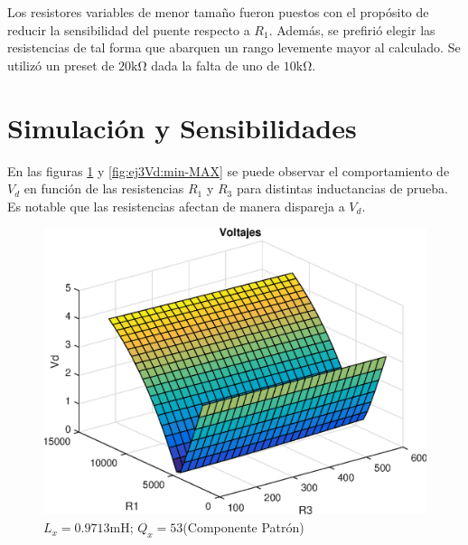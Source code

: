     \begin{figure}[ht!]
        \begin{center}
            
        \end{center}
    \end{figure}

    Los resistores variables de menor tamaño fueron puestos con el propósito de reducir
    la sensibilidad del puente respecto a $R_1$. Además, se prefirió elegir las resistencias de tal forma que
    abarquen un rango levemente mayor al calculado. Se utilizó un preset de $20\si{\kilo\ohm}$ dada la falta
    de uno de $10\si{\kilo\ohm}$.

    \section{Simulación y Sensibilidades}

    En las figuras \ref{fig:ej3Vd:patron} y \ref{fig:ej3Vd:min-MAX} se puede observar el comportamiento
    de $V_d$ en función de las resistencias $R_1$ y $R_3$ para distintas inductancias de prueba.
    Es notable que las resistencias afectan de manera dispareja a $V_d$.
    
    \begin{figure}[ht]
        \begin{center}
            \includegraphics[width=0.45\linewidth]{MATLAB/ej3Vd}
            \caption{$L_x=0.9713\si{\milli\henry}$; $Q_x=53$(Componente Patrón)}
            \label{fig:ej3Vd:patron}
        \end{center}
    \end{figure}

